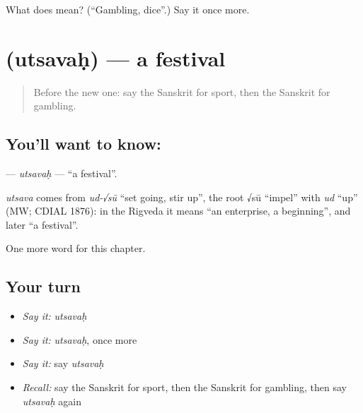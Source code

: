 \begin{tcolorbox}[breakable,colback=teal!4,colframe=teal!35!black,title={Before you move on}]
What does  mean? (\textquotedblleft{}Gambling, dice\textquotedblright{}.) Say it once more.
\end{tcolorbox}
\section[\texorpdfstring{\sk{उत्सवः} (utsavaḥ)}{उत्सवः (utsavaḥ)}]{ (utsavaḥ) — a festival}

\label{lesson:SA-C163-utsavah}



\begin{quote}
Before the new one: say the Sanskrit for sport, then the Sanskrit for gambling.
\end{quote}

\subsection*{You'll want to know: }
\textbf{} — \emph{utsavaḥ} — \textquotedblleft{}a festival\textquotedblright{}.

\begin{cousinweb}
\emph{utsava} comes from \emph{ud-√sū} \textquotedblleft{}set going, stir up\textquotedblright{}, the root √sū \textquotedblleft{}impel\textquotedblright{} with \emph{ud} \textquotedblleft{}up\textquotedblright{} (MW; CDIAL 1876): in the Rigveda it means \textquotedblleft{}an enterprise, a beginning\textquotedblright{}, and later \textquotedblleft{}a festival\textquotedblright{}.
\end{cousinweb}

\begin{grammarlens}[title={What you've built}]
One more word for this chapter.
\end{grammarlens}

\subsection*{Your turn}
\begin{itemize}
\raggedright
  \item \emph{Say it:} \emph{utsavaḥ}
  \item \emph{Say it:} \emph{utsavaḥ}, once more
  \item \emph{Say it:} say \emph{utsavaḥ}
  \item \emph{Recall:} say the Sanskrit for sport, then the Sanskrit for gambling, then say \emph{utsavaḥ} again
\end{itemize}

